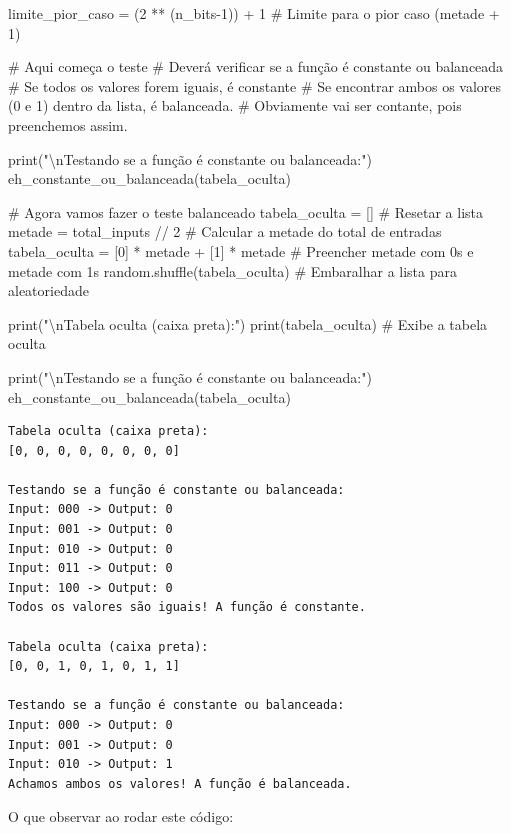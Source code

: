 \documentclass[
  brazilian,
]{report}
\newenvironment{Shaded}{\begin{snugshade}}{\end{snugshade}}
\newcommand{\NormalTok}[1]{\textcolor[rgb]{0.00,0.23,0.31}{#1}}
\begin{document}
\begin{Shaded}
\begin{Highlighting}[]
\NormalTok{limite\_pior\_caso = (2 ** (n\_bits{-}1)) + 1    \# Limite para o pior caso (metade + 1)}

\NormalTok{\# Aqui começa o teste}
\NormalTok{\# Deverá verificar se a função é constante ou balanceada}
\NormalTok{\# Se todos os valores forem iguais, é constante}
\NormalTok{\# Se encontrar ambos os valores (0 e 1) dentro da lista, é balanceada.}
\NormalTok{\# Obviamente vai ser contante, pois preenchemos assim.}

\NormalTok{print("\textbackslash{}nTestando se a função é constante ou balanceada:")}
\NormalTok{eh\_constante\_ou\_balanceada(tabela\_oculta)}
    
\NormalTok{\# Agora vamos fazer o teste balanceado}
\NormalTok{tabela\_oculta = []                          \# Resetar a lista}
\NormalTok{metade = total\_inputs // 2                  \# Calcular a metade do total de entradas}
\NormalTok{tabela\_oculta = [0] * metade + [1] * metade \# Preencher metade com 0s e metade com 1s}
\NormalTok{random.shuffle(tabela\_oculta)               \# Embaralhar a lista para aleatoriedade}

\NormalTok{print("\textbackslash{}nTabela oculta (caixa preta):")}
\NormalTok{print(tabela\_oculta)                        \# Exibe a tabela oculta}

\NormalTok{print("\textbackslash{}nTestando se a função é constante ou balanceada:")}
\NormalTok{eh\_constante\_ou\_balanceada(tabela\_oculta)}
\end{Highlighting}
\end{Shaded}

\begin{verbatim}
Tabela oculta (caixa preta):
[0, 0, 0, 0, 0, 0, 0, 0]

Testando se a função é constante ou balanceada:
Input: 000 -> Output: 0
Input: 001 -> Output: 0
Input: 010 -> Output: 0
Input: 011 -> Output: 0
Input: 100 -> Output: 0
Todos os valores são iguais! A função é constante.

Tabela oculta (caixa preta):
[0, 0, 1, 0, 1, 0, 1, 1]

Testando se a função é constante ou balanceada:
Input: 000 -> Output: 0
Input: 001 -> Output: 0
Input: 010 -> Output: 1
Achamos ambos os valores! A função é balanceada.
\end{verbatim}

O que observar ao rodar este código:
\end{document}
